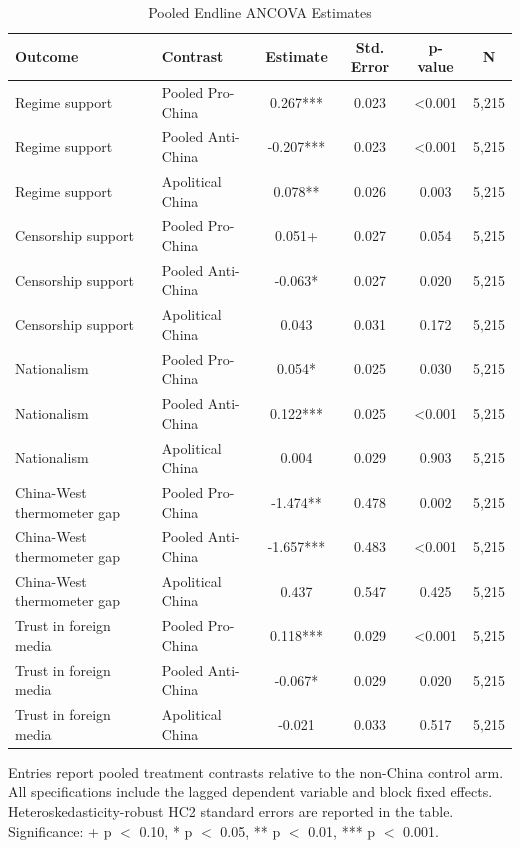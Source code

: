 \begin{table}[H]
\centering
\caption{Pooled Endline ANCOVA Estimates}
\label{tab:pooled_effects_t1}
\footnotesize
\begin{threeparttable}
\begin{tabular}{llcccc}
\toprule
Outcome & Contrast & Estimate & Std. Error & p-value & N \\
\midrule
Regime support & Pooled Pro-China & 0.267*** & 0.023 & <0.001 & 5,215 \\
Regime support & Pooled Anti-China & -0.207*** & 0.023 & <0.001 & 5,215 \\
Regime support & Apolitical China & 0.078** & 0.026 & 0.003 & 5,215 \\
Censorship support & Pooled Pro-China & 0.051+ & 0.027 & 0.054 & 5,215 \\
Censorship support & Pooled Anti-China & -0.063* & 0.027 & 0.020 & 5,215 \\
Censorship support & Apolitical China & 0.043 & 0.031 & 0.172 & 5,215 \\
Nationalism & Pooled Pro-China & 0.054* & 0.025 & 0.030 & 5,215 \\
Nationalism & Pooled Anti-China & 0.122*** & 0.025 & <0.001 & 5,215 \\
Nationalism & Apolitical China & 0.004 & 0.029 & 0.903 & 5,215 \\
China-West thermometer gap & Pooled Pro-China & -1.474** & 0.478 & 0.002 & 5,215 \\
China-West thermometer gap & Pooled Anti-China & -1.657*** & 0.483 & <0.001 & 5,215 \\
China-West thermometer gap & Apolitical China & 0.437 & 0.547 & 0.425 & 5,215 \\
Trust in foreign media & Pooled Pro-China & 0.118*** & 0.029 & <0.001 & 5,215 \\
Trust in foreign media & Pooled Anti-China & -0.067* & 0.029 & 0.020 & 5,215 \\
Trust in foreign media & Apolitical China & -0.021 & 0.033 & 0.517 & 5,215 \\
\bottomrule
\end{tabular}
\begin{tablenotes}[flushleft]
\footnotesize
\item Entries report pooled treatment contrasts relative to the non-China control arm. All specifications include the lagged dependent variable and block fixed effects. Heteroskedasticity-robust HC2 standard errors are reported in the table. Significance: + p $<$ 0.10, * p $<$ 0.05, ** p $<$ 0.01, *** p $<$ 0.001.
\end{tablenotes}
\end{threeparttable}
\end{table}

